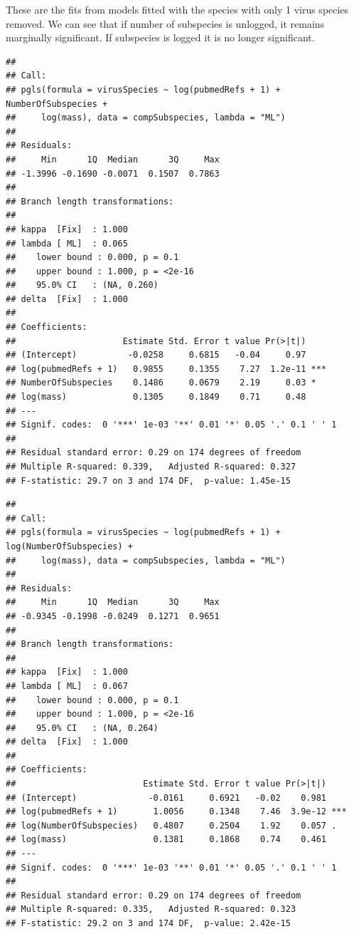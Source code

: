 These are the fits from models fitted with the species with only 1 virus species removed.
We can see that if number of subspecies is unlogged, it remains marginally significant.
If subspecies is logged it is no longer significant.
\begin{knitrout}\footnotesize
{}\color{fgcolor}\begin{kframe}
\begin{alltt}

\end{alltt}
\begin{verbatim}
## 
## Call:
## pgls(formula = virusSpecies ~ log(pubmedRefs + 1) + NumberOfSubspecies + 
##     log(mass), data = compSubspecies, lambda = "ML")
## 
## Residuals:
##     Min      1Q  Median      3Q     Max 
## -1.3996 -0.1690 -0.0071  0.1507  0.7863 
## 
## Branch length transformations:
## 
## kappa  [Fix]  : 1.000
## lambda [ ML]  : 0.065
##    lower bound : 0.000, p = 0.1  
##    upper bound : 1.000, p = <2e-16
##    95.0% CI   : (NA, 0.260)
## delta  [Fix]  : 1.000
## 
## Coefficients:
##                     Estimate Std. Error t value Pr(>|t|)    
## (Intercept)          -0.0258     0.6815   -0.04     0.97    
## log(pubmedRefs + 1)   0.9855     0.1355    7.27  1.2e-11 ***
## NumberOfSubspecies    0.1486     0.0679    2.19     0.03 *  
## log(mass)             0.1305     0.1849    0.71     0.48    
## ---
## Signif. codes:  0 '***' 1e-03 '**' 0.01 '*' 0.05 '.' 0.1 ' ' 1
## 
## Residual standard error: 0.29 on 174 degrees of freedom
## Multiple R-squared: 0.339,	Adjusted R-squared: 0.327 
## F-statistic: 29.7 on 3 and 174 DF,  p-value: 1.45e-15
\end{verbatim}
\begin{alltt}
\end{alltt}
\begin{verbatim}
## 
## Call:
## pgls(formula = virusSpecies ~ log(pubmedRefs + 1) + log(NumberOfSubspecies) + 
##     log(mass), data = compSubspecies, lambda = "ML")
## 
## Residuals:
##     Min      1Q  Median      3Q     Max 
## -0.9345 -0.1998 -0.0249  0.1271  0.9651 
## 
## Branch length transformations:
## 
## kappa  [Fix]  : 1.000
## lambda [ ML]  : 0.067
##    lower bound : 0.000, p = 0.1  
##    upper bound : 1.000, p = <2e-16
##    95.0% CI   : (NA, 0.264)
## delta  [Fix]  : 1.000
## 
## Coefficients:
##                         Estimate Std. Error t value Pr(>|t|)    
## (Intercept)              -0.0161     0.6921   -0.02    0.981    
## log(pubmedRefs + 1)       1.0056     0.1348    7.46  3.9e-12 ***
## log(NumberOfSubspecies)   0.4807     0.2504    1.92    0.057 .  
## log(mass)                 0.1381     0.1868    0.74    0.461    
## ---
## Signif. codes:  0 '***' 1e-03 '**' 0.01 '*' 0.05 '.' 0.1 ' ' 1
## 
## Residual standard error: 0.29 on 174 degrees of freedom
## Multiple R-squared: 0.335,	Adjusted R-squared: 0.323 
## F-statistic: 29.2 on 3 and 174 DF,  p-value: 2.42e-15
\end{verbatim}
\end{kframe}
\end{knitrout}
